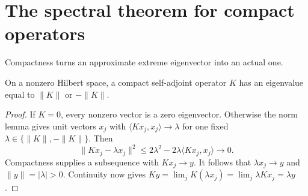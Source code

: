 \section{The spectral theorem for compact operators}

Compactness turns an approximate extreme eigenvector into an actual one.

\begin{lemma}\label{lem:eigenvalue}
On a nonzero Hilbert space, a compact self-adjoint operator $K$ has an eigenvalue equal to $\|K\|$ or $-\|K\|$.
\end{lemma}
\begin{proof}
If $K=0$, every nonzero vector is a zero eigenvector. Otherwise the norm lemma gives unit vectors $x_j$ with $\langle Kx_j,x_j\rangle\to\lambda$ for one fixed $\lambda\in\{\|K\|,-\|K\|\}$. Then
\[
\|Kx_j-\lambda x_j\|^2
\le2\lambda^2-2\lambda\langle Kx_j,x_j\rangle\longrightarrow0.
\]
Compactness supplies a subsequence with $Kx_j\to y$. It follows that $\lambda x_j\to y$ and $\|y\|=|\lambda|>0$. Continuity now gives $Ky=\lim_jK(\lambda x_j)=\lim_j\lambda Kx_j=\lambda y$.
\end{proof}


